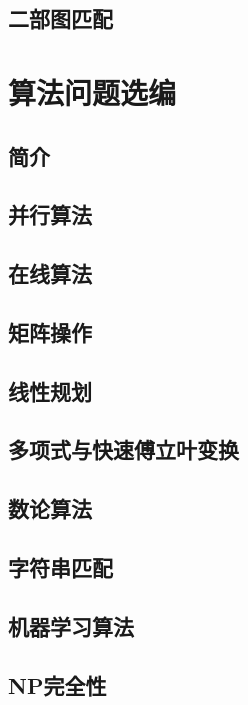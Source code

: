 \documentclass[lang=cn,newtx,10pt,scheme=chinese]{elegantbook}
\begin{document}
\chapter{二部图匹配}

\part{算法问题选编}

\chapter*{简介}

\chapter{并行算法}

\chapter{在线算法}

\chapter{矩阵操作}

\chapter{线性规划}

\chapter{多项式与快速傅立叶变换}

\chapter{数论算法}

\chapter{字符串匹配}

\chapter{机器学习算法}

\chapter{NP完全性}
\end{document}
